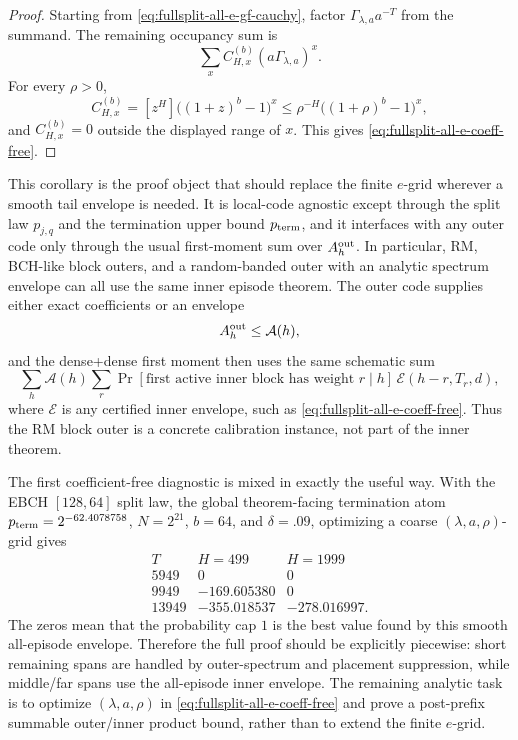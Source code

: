 \begin{proof}
Starting from \eqref{eq:fullsplit-all-e-gf-cauchy}, factor
\(\Gamma_{\lambda,a}a^{-T}\) from the summand.  The remaining occupancy sum is
\[
\sum_x C_{H,x}^{(b)}(a\Gamma_{\lambda,a})^x.
\]
For every \(\rho>0\),
\[
C_{H,x}^{(b)}
= [z^H]\big((1+z)^b-1\big)^x
\le
\rho^{-H}\big((1+\rho)^b-1\big)^x,
\]
and \(C_{H,x}^{(b)}=0\) outside the displayed range of \(x\).  This gives
\eqref{eq:fullsplit-all-e-coeff-free}.
\end{proof}

This corollary is the proof object that should replace the finite \(e\)-grid wherever a smooth tail envelope is needed.
It is local-code agnostic except through the split law \(p_{j,q}\) and the termination upper bound \(p_{\rm term}\), and
it interfaces with any outer code only through the usual first-moment sum over \(A_h^{\rm out}\).  In particular, RM,
BCH-like block outers, and a random-banded outer with an analytic spectrum envelope can all use the same inner episode
theorem.  The outer code supplies either exact coefficients or an envelope
\[
A_h^{\rm out}\le \mathcal A(h),
\]
and the dense+dense first moment then uses the same schematic sum
\[
\sum_h \mathcal A(h)\sum_r
\Pr[\text{first active inner block has weight }r\mid h]\,
\mathcal E(h-r,T_r,d),
\]
where \(\mathcal E\) is any certified inner envelope, such as
\eqref{eq:fullsplit-all-e-coeff-free}.  Thus the RM block outer is a concrete calibration instance, not part of the
inner theorem.

The first coefficient-free diagnostic is mixed in exactly the useful way.  With the EBCH \([128,64]\) split law,
the global theorem-facing termination atom \(p_{\rm term}=2^{-62.4078758}\), \(N=2^{21}\), \(b=64\), and \(\delta=.09\),
optimizing a coarse
\((\lambda,a,\rho)\)-grid gives
\[
\begin{array}{c|cc}
T & H=499 & H=1999\\
\hline
5949 & 0 & 0\\
9949 & -169.605380 & 0\\
13949 & -355.018537 & -278.016997 .
\end{array}
\]
The zeros mean that the probability cap \(1\) is the best value found by this smooth all-episode envelope.  Therefore
the full proof should be explicitly piecewise: short remaining spans are handled by outer-spectrum and placement
suppression, while middle/far spans use the all-episode inner envelope.  The remaining analytic task is to optimize
\((\lambda,a,\rho)\) in \eqref{eq:fullsplit-all-e-coeff-free} and prove a post-prefix summable outer/inner product
bound, rather than to extend the finite \(e\)-grid.

